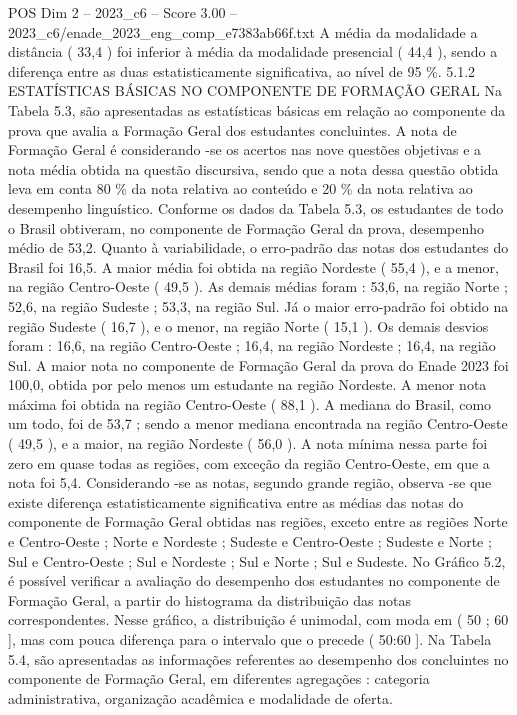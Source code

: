\begin{textsample}{POS Dim 2 – 2023\_c6 – Score 3.00 – 2023\_c6/enade\_2023\_eng\_comp\_e7383ab66f.txt}
A média da modalidade a distância ( 33,4 ) foi inferior à média da modalidade presencial ( 44,4 ), sendo a diferença entre as duas estatisticamente significativa, ao nível de 95 \%. 5.1.2 ESTATÍSTICAS BÁSICAS NO COMPONENTE DE FORMAÇÃO GERAL Na Tabela 5.3, são apresentadas as estatísticas básicas em relação ao componente da prova que avalia a Formação Geral dos estudantes concluintes.
A nota de Formação Geral é considerando -se os acertos nas nove questões objetivas e a nota média obtida na questão discursiva, sendo que a nota dessa questão obtida leva em conta 80 \% da nota relativa ao conteúdo e 20 \% da nota relativa ao desempenho linguístico.
Conforme os dados da Tabela 5.3, os estudantes de todo o Brasil obtiveram, no componente de Formação Geral da prova, desempenho médio de 53,2.
Quanto à variabilidade, o erro-padrão das notas dos estudantes do Brasil foi 16,5.
A maior média foi obtida na região Nordeste ( 55,4 ), e a menor, na região Centro-Oeste ( 49,5 ).
As demais médias foram : 53,6, na região Norte ; 52,6, na região Sudeste ; 53,3, na região Sul.
Já o maior erro-padrão foi obtido na região Sudeste ( 16,7 ), e o menor, na região Norte ( 15,1 ).
Os demais desvios foram : 16,6, na região Centro-Oeste ; 16,4, na região Nordeste ; 16,4, na região Sul.
A maior nota no componente de Formação Geral da prova do Enade 2023 foi 100,0, obtida por pelo menos um estudante na região Nordeste.
A menor nota máxima foi obtida na região Centro-Oeste ( 88,1 ).
A mediana do Brasil, como um todo, foi de 53,7 ; sendo a menor mediana encontrada na região Centro-Oeste ( 49,5 ), e a maior, na região Nordeste ( 56,0 ).
A nota mínima nessa parte foi zero em quase todas as regiões, com exceção da região Centro-Oeste, em que a nota foi 5,4.
Considerando -se as notas, segundo grande região, observa -se que existe diferença estatisticamente significativa entre as médias das notas do componente de Formação Geral obtidas nas regiões, exceto entre as regiões Norte e Centro-Oeste ; Norte e Nordeste ; Sudeste e Centro-Oeste ; Sudeste e Norte ; Sul e Centro-Oeste ; Sul e Nordeste ; Sul e Norte ; Sul e Sudeste.
No Gráfico 5.2, é possível verificar a avaliação do desempenho dos estudantes no componente de Formação Geral, a partir do histograma da distribuição das notas correspondentes.
Nesse gráfico, a distribuição é unimodal, com moda em ( 50 ; 60 ], mas com pouca diferença para o intervalo que o precede ( 50:60 ].
Na Tabela 5.4, são apresentadas as informações referentes ao desempenho dos concluintes no componente de Formação Geral, em diferentes agregações : categoria administrativa, organização acadêmica e modalidade de oferta.

\end{textsample}
